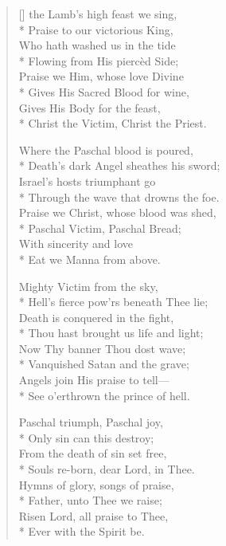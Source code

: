 \newHymn

\settowidth{\versewidth}{At the Lamb's high feast we sing}
\begin{verse}[\versewidth]
 the Lamb's high feast we sing,\\*
Praise to our victorious King,\\
Who hath washed us in the tide\\*
Flowing from His piercèd Side;\\\pointorig
Praise we Him, whose love Divine\\*
Gives His Sacred Blood for wine,\\
Gives His Body for the feast,\\*
Christ the Victim, Christ the Priest.

Where the Paschal blood is poured,\\*
Death's dark Angel sheathes his sword;\\
Israel's hosts triumphant go\\*
Through the wave that drowns the foe.\\
Praise we Christ, whose blood was shed,\\*
Paschal Victim, Paschal Bread;\\
With sincerity and love\\*
Eat we Manna from above.

Mighty Victim from the sky,\\*
Hell's fierce pow'rs beneath Thee lie;\\
Death is conquered in the fight,\\*
Thou hast brought us life and light;\\
Now Thy banner Thou dost wave;\\*
Vanquished Satan and the grave;\\
Angels join His praise to tell---\\*
See o'erthrown the prince of hell.

Paschal triumph, Paschal joy,\\*
Only sin can this destroy;\\
From the death of sin set free,\\*
Souls re-born, dear Lord, in Thee.\\
Hymns of glory, songs of praise,\\*
Father, unto Thee we raise;\\
Risen Lord, all praise to Thee,\\*
Ever with the Spirit be.

\end{verse}

